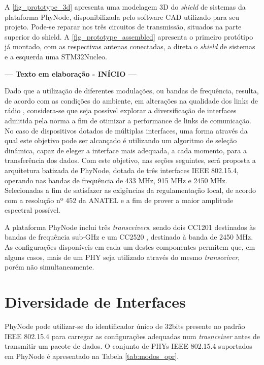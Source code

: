 \documentclass[
	12pt,				%
	openright,			%
	oneside,
	a4paper,			%
	english,			%
	french,				%
	spanish,			%
	brazil				%
	]{abntex2}
\begin{document}
A \autoref{fig_prototype_3d} apresenta uma modelagem 3D do \textit{shield} de sistemas da plataforma PhyNode, disponibilizada pelo software CAD utilizado para seu projeto. Pode-se reparar nos três circuitos de transmissão, situados na parte superior do shield. A \autoref{fig_prototype_assembled} apresenta o primeiro protótipo já montado, com as respectivas antenas conectadas, a direta o \textit{shield} de sistemas e a esquerda uma STM32Nucleo.


\begin{center}
	\textbf{--- Texto em elaboração - INÍCIO ---}
\end{center}

Dado que a utilização de diferentes modulações, ou bandas de frequência, resulta, de acordo com as condições do ambiente, em alterações na qualidade dos links de rádio \cite{bibid}, considera-se que seja possível explorar a diversificação de interfaces admitida pela norma a fim de otimizar a performance de links de comunicação. No caso de dispositivos dotados de múltiplas interfaces, uma forma através da qual este objetivo pode ser alcançado é utilizando um algoritmo de seleção dinâmica, capaz de eleger a interface mais adequada, a cada momento, para a transferência dos dados. Com este objetivo, nas seções seguintes, será proposta a arquitetura batizada de PhyNode, dotada de três interfaces IEEE 802.15.4, operando nas bandas de frequência de 433 MHz, 915 MHz e 2450 MHz. Selecionadas a fim de satisfazer as exigências da regulamentação local, de acordo com a resolução nº 452 da ANATEL \cite{bibid} e a fim de prover a maior amplitude espectral possível.


A plataforma PhyNode inclui três \textit{transceivers}, sendo dois CC1201 \cite{bibid} destinados às bandas de frequência sub-GHz e um CC2520 \cite{bibid}, destinado à banda de 2450 MHz. As configurações disponíveis em cada um destes componentes permitem que, em alguns casos, mais de um PHY seja utilizado através do mesmo \textit{transceiver}, porém  não simultaneamente.
	\section{Diversidade de Interfaces}
	PhyNode pode utilizar-se do identificador único de 32bits presente no padrão IEEE 802.15.4 para carregar as configurações adequadas num \textit{trasnceiver} antes de transmitir um pacote de dados. O conjunto de PHYs IEEE 802.15.4 suportados em PhyNode é apresentado na Tabela \ref{tab:modos_opr}.
	
\end{document}
